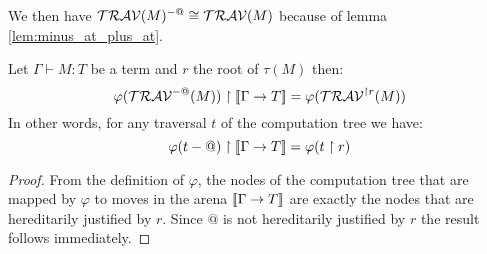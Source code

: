 We then have $\mathcal{TRAV}(M)^{-@} \cong \mathcal{TRAV}(M)$ because of lemma \ref{lem:minus_at_plus_at}.

\begin{lem} Let $\Gamma \vdash M :T$ be a term and $r$ the root of $\tau(M)$ then:
\label{lem:varphi_filter}
$$ \varphi(\mathcal{TRAV}^{-@}(M)) \upharpoonright {[\![\Gamma \rightarrow T ]\!]} = \varphi(\mathcal{TRAV}^{\upharpoonright r}(M)) $$
In other words, for any traversal $t$ of the computation tree we have:
$$\varphi(t-@) \upharpoonright {[\![\Gamma \rightarrow T ]\!]} = \varphi(t\upharpoonright r)$$
\end{lem}
\begin{proof}
    From the definition of $\varphi$, the nodes of the computation tree that are mapped by $\varphi$
    to moves in the arena ${[\![ \Gamma \rightarrow T ]\!]}$ are exactly the nodes that are hereditarily justified by $r$.
    Since $@$ is not hereditarily justified by $r$ the result follows immediately.
\end{proof}

